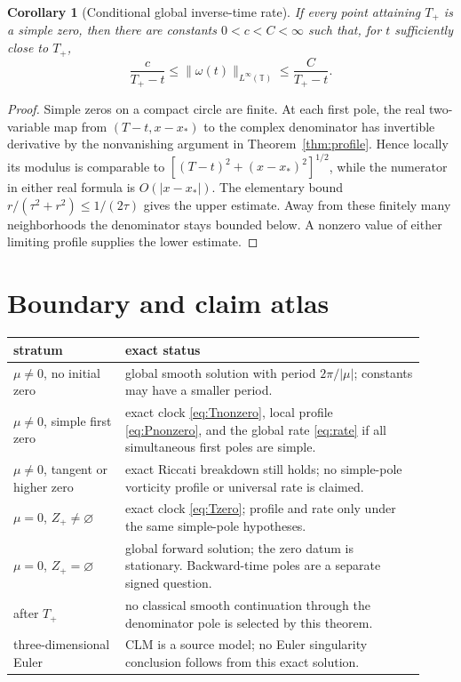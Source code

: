 \documentclass[10pt]{article}
\newcommand{\TT}{\mathbb T}
\newtheorem{corollary}{Corollary}
\begin{document}
\begin{corollary}[Conditional global inverse-time rate]
If every point attaining $T_+$ is a simple zero, then there are constants
$0<c<C<\infty$ such that, for $t$ sufficiently close to $T_+$,
\begin{equation}
 \frac{c}{T_+-t}\le\|\omega(t)\|_{L^\infty(\TT)}
 \le\frac{C}{T_+-t}.                             \label{eq:rate}
\end{equation}
\end{corollary}

\begin{proof}
Simple zeros on a compact circle are finite.  At each first pole, the real
two-variable map from $(T-t,x-x_*)$ to the complex denominator has
invertible derivative by the nonvanishing argument in
Theorem~\ref{thm:profile}.  Hence locally its modulus is comparable to
$[(T-t)^2+(x-x_*)^2]^{1/2}$, while the numerator in either real formula is
$O(|x-x_*|)$.  The elementary bound
$r/(\tau^2+r^2)\le1/(2\tau)$ gives the upper estimate.  Away from these
finitely many neighborhoods the denominator stays bounded below.  A
nonzero value of either limiting profile supplies the lower estimate.
\end{proof}

\section{Boundary and claim atlas}

\begin{center}
\begin{tabular}{>{\raggedright\arraybackslash}p{0.25\linewidth}
                >{\raggedright\arraybackslash}p{0.67\linewidth}}
\toprule
stratum & exact status\\
\midrule
$\mu\ne0$, no initial zero & global smooth solution with period
$2\pi/|\mu|$; constants may have a smaller period.\\
$\mu\ne0$, simple first zero & exact clock
\eqref{eq:Tnonzero}, local profile \eqref{eq:Pnonzero}, and the global rate
\eqref{eq:rate} if all simultaneous first poles are simple.\\
$\mu\ne0$, tangent or higher zero & exact Riccati breakdown still holds;
no simple-pole vorticity profile or universal rate is claimed.\\
$\mu=0$, $Z_+\ne\varnothing$ & exact clock \eqref{eq:Tzero}; profile and
rate only under the same simple-pole hypotheses.\\
$\mu=0$, $Z_+=\varnothing$ & global forward solution; the zero datum is
stationary.  Backward-time poles are a separate signed question.\\
after $T_+$ & no classical smooth continuation through the denominator
pole is selected by this theorem.\\
three-dimensional Euler & CLM is a source model; no Euler singularity
conclusion follows from this exact solution.\\
\bottomrule
\end{tabular}
\end{center}
\end{document}
